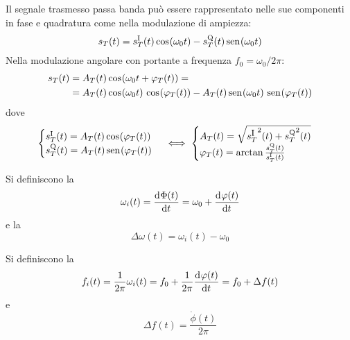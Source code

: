 Il segnale trasmesso passa banda può essere rappresentato nelle sue componenti in fase e quadratura come nella modulazione di ampiezza:
\begin{equation}
s_T(t)=s_T^\text{I}(t)\,{\operatorname{cos}}^{}\!\left({\omega_0 t}\right)-s_T^\text{Q}(t)\,{\operatorname{sen}}^{}\!\left({\omega_0 t}\right)
\end{equation}
Nella modulazione angolare con portante a frequenza $f_0=\omega_0/2\pi$:
\begin{equation}\begin{split}
s_T(t)&=A_T(t)\,{\operatorname{cos}}^{}\!\left({\omega_0 t+\varphi_T(t)}\right)=\\&=A_T(t)\,{\operatorname{cos}}^{}\!\left({\omega_0 t}\right)\,{\operatorname{cos}}^{}\!\left({\varphi_T(t)}\right)-A_T(t)\,{\operatorname{sen}}^{}\!\left({\omega_0 t}\right)\,{\operatorname{sen}}^{}\!\left({\varphi_T(t)}\right)
\end{split}\end{equation}
dove
\begin{equation}
\begin{cases}
s_T^\text{I}(t)=A_T(t)\,{\operatorname{cos}}^{}\!\left({\varphi_T(t)}\right)\\s_T^\text{Q}(t)=A_T(t)\,{\operatorname{sen}}^{}\!\left({\varphi_T(t)}\right)
\end{cases}\iff\begin{cases}
A_T(t)=\sqrt{{s_T^\text{\small I}}^2(t)+{s_T^\text{Q}}^2(t)}\\\varphi_T(t)=\arctan\frac{s_T^\text{Q}(t)}{s_T^\text{I}(t)}
\end{cases}
\end{equation}

\begin{definizione}Si definiscono la \begin{equation}\omega_i(t)=\dfrac{\mathop{}\!\mathrm{d}^{}\Phi(t)}{\mathop{}\!\mathrm{d} t^{}}= \omega_0+\dfrac{\mathop{}\!\mathrm{d}^{}\varphi(t)}{\mathop{}\!\mathrm{d} t^{}}\end{equation} e la \begin{equation}\Delta\omega(t)=\omega_i(t)-\omega_0
\end{equation}\end{definizione}
\begin{definizione}Si definiscono la \begin{equation}f_i(t)=\frac{1}{2\pi}\omega_i(t)=f_0+\frac{1}{2\pi}\dfrac{\mathop{}\!\mathrm{d}^{}\varphi(t)}{\mathop{}\!\mathrm{d} t^{}}=f_0+\Delta f(t)\end{equation} e \begin{equation}\Delta f(t)=\frac{\dot{\phi}(t)}{2\pi}\end{equation}\end{definizione}

